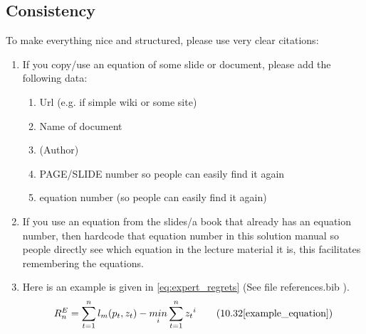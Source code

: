 \subsection{Consistency}
To make everything nice and structured, please use very clear citations:
\begin{enumerate}
	\item If you copy/use an equation of some slide or document, please add the following data:
	\begin{enumerate}
		\item Url (e.g. if simple wiki or some site)
		\item Name of document
		\item (Author)
		\item PAGE/SLIDE number so people can easily find it again
		\item equation number (so people can easily find it again)
	\end{enumerate}
	\item If you use an equation from the slides/a book that already has an equation number, then hardcode that equation number in this solution manual so people directly see which equation in the lecture material it is, this facilitates remembering the equations.
	\item Here is an example is given in \cref{eq:expert_regrets} (See file references.bib \cite{example_equation}). 
	\begin{equation}
    R_n^E=\sum_{t=1}^{n}l_m(p_t,z_t)-{\underset{i}{min}} \sum_{t=1}^{n}{z_t}^i
	\tag{10.32\cite{example_equation}}   
    \label{eq:expert_regrets}
	\end{equation}
\end{enumerate}